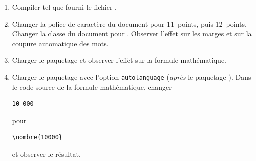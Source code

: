\begin{exercice}[nosol]
  \begin{enumerate}
  \item Compiler tel que fourni le fichier
    .
  \item Changer la police de caractère du document pour 11~points,
    puis 12~points. Changer la classe du document pour .
    Observer l'effet sur les marges et sur la coupure automatique des
    mots.
  \item Charger le paquetage  et observer l'effet sur la
    formule mathématique.
  \item Charger le paquetage  avec l'option
    \verb=autolanguage= (\emph{après} le paquetage ). Dans
    le code source de la formule mathématique, changer
\begin{lstlisting}
10 000
\end{lstlisting}
    pour
\begin{lstlisting}
\nombre{10000}
\end{lstlisting}
    et observer le résultat.
  \end{enumerate}
\end{exercice}

